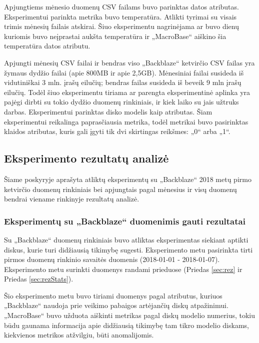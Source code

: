 \documentclass{VUMIFPSkursinis}
\begin{document}
Apjungtiems mėnesio duomenų CSV failams buvo parinktas datos atributas. Eksperimentui parinkta metrika buvo temperatūra. Atlikti tyrimai su visais trimis mėnesių failais atskirai. Šiuo eksperimentu nagrinėjama ar buvo dienų kuriomis buvo neįprastai aukšta temperatūra ir „MacroBase“ aiškino šia temperatūra datos atributu.


Apjungti mėnesių CSV failai ir bendras viso „Backblaze“ ketvirčio CSV failas yra žymaus dydžio failai (apie 800MB ir apie 2,5GB). Mėnesiniai failai susideda iš vidutiniškai 3 mln. įrašų eilučių; bendras failas susideda iš beveik 9 mln įrašų eilučių. Todėl šiuo eksperimentu tiriama ar parengta eksperimentinė aplinka yra pajėgi dirbti su tokio dydžio duomenų rinkiniais, ir kiek laiko su jais užtruks darbas. Eksperimentui parinktas disko modelis kaip atributas. Šiam eksperimentui reikalinga paprasčiausia metrika, todėl metrikai buvo pasirinktas klaidos atributas, kuris gali įgyti tik dvi skirtingas reikšmes: „0“ arba „1“.

\subsection{Eksperimento rezultatų analizė} \label{subsec:exprez}
Šiame poskyryje aprašyta atliktų eksperimentų su „Backblaze“ 2018 metų pirmo ketvirčio duomenų rinkiniais bei apjungtais pagal mėnesius ir visų duomenų bendrai viename rinkinyje rezultatų analizė.

\subsubsection{Eksperimentų su „Backblaze“ duomenimis gauti rezultatai} \label{subsubsec:backblazeExp}
Su „Backblaze“ duomenų rinkiniais buvo atliktas eksperimentas siekiant aptikti diskus, kurie turi didžiausią tikimybę sugesti. Eksperimento metu pasirinkta tirti pirmos duomenų rinkinio savaitės duomenis (2018-01-01 - 2018-01-07). Eksperimento metu surinkti duomenys randami prieduose (Priedas \ref{sec:rez} ir Priedas \ref{sec:rezStats}).\par
Šio eksperimento metu buvo tiriami duomenys pagal atributus, kuriuos „Backblaze“ naudoja prie veikimo pabaigos artėjančių diskų atpažinimui. „MacroBase“ buvo užduota aiškinti metrikas pagal diskų modelio numerius, tokiu būdu gaunama informacija apie didžiausią tikimybę tam tikro modelio diskams, kiekvienos metrikos atžvilgiu, būti anomalijomis.\par
\end{document}
